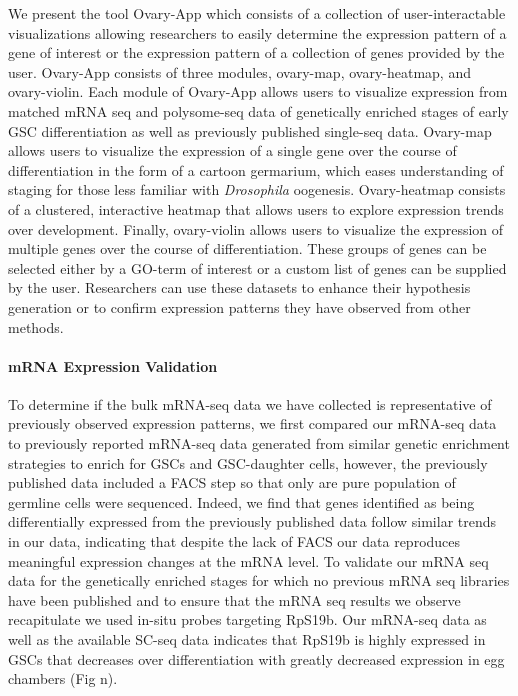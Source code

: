 \documentclass[]{elsarticle} %
\begin{document}
We present the tool Ovary-App which consists of a collection of
user-interactable visualizations allowing researchers to easily
determine the expression pattern of a gene of interest or the expression
pattern of a collection of genes provided by the user. Ovary-App
consists of three modules, ovary-map, ovary-heatmap, and ovary-violin.
Each module of Ovary-App allows users to visualize expression from
matched mRNA seq and polysome-seq data of genetically enriched stages of
early GSC differentiation as well as previously published single-seq
data. Ovary-map allows users to visualize the expression of a single
gene over the course of differentiation in the form of a cartoon
germarium, which eases understanding of staging for those less familiar
with \emph{Drosophila} oogenesis. Ovary-heatmap consists of a clustered,
interactive heatmap that allows users to explore expression trends over
development. Finally, ovary-violin allows users to visualize the
expression of multiple genes over the course of differentiation. These
groups of genes can be selected either by a GO-term of interest or a
custom list of genes can be supplied by the user. Researchers can use
these datasets to enhance their hypothesis generation or to confirm
expression patterns they have observed from other methods.

\hypertarget{mrna-expression-validation}{%
\paragraph{mRNA Expression
Validation}\label{mrna-expression-validation}}

\hfill\break

To determine if the bulk mRNA-seq data we have collected is
representative of previously observed expression patterns, we first
compared our mRNA-seq data to previously reported mRNA-seq data
generated from similar genetic enrichment strategies to enrich for GSCs
and GSC-daughter cells, however, the previously published data included
a FACS step so that only are pure population of germline cells were
sequenced. Indeed, we find that genes identified as being differentially
expressed from the previously published data follow similar trends in
our data, indicating that despite the lack of FACS our data reproduces
meaningful expression changes at the mRNA level. To validate our mRNA
seq data for the genetically enriched stages for which no previous mRNA
seq libraries have been published and to ensure that the mRNA seq
results we observe recapitulate we used in-situ probes targeting RpS19b.
Our mRNA-seq data as well as the available SC-seq data indicates that
RpS19b is highly expressed in GSCs that decreases over differentiation
with greatly decreased expression in egg chambers (Fig n).
\end{document}
